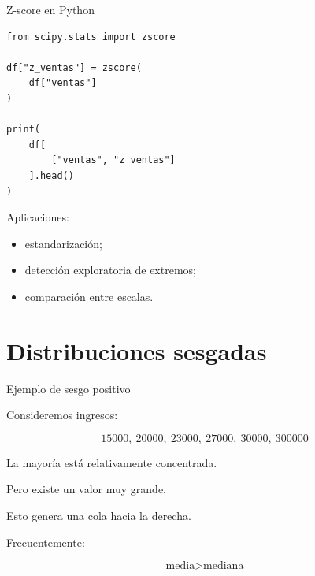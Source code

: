 \documentclass[aspectratio=169,11pt]{beamer}
\begin{document}
\begin{frame}[fragile]{Z-score en Python}

\begin{lstlisting}
from scipy.stats import zscore

df["z_ventas"] = zscore(
    df["ventas"]
)

print(
    df[
        ["ventas", "z_ventas"]
    ].head()
)
\end{lstlisting}

Aplicaciones:

\begin{itemize}

    \item estandarización;

    \item detección exploratoria de extremos;

    \item comparación entre escalas.

\end{itemize}

\end{frame}

\section{Distribuciones sesgadas}

\begin{frame}{Ejemplo de sesgo positivo}

Consideremos ingresos:

\[
15000,\ 20000,\ 23000,\ 27000,\ 30000,\ 300000
\]

La mayoría está relativamente concentrada.

Pero existe un valor muy grande.

\vspace{0.3cm}

Esto genera una cola hacia la derecha.

\vspace{0.3cm}

Frecuentemente:

\[
\text{media}
>
\text{mediana}
\]

\end{frame}

\end{document}

